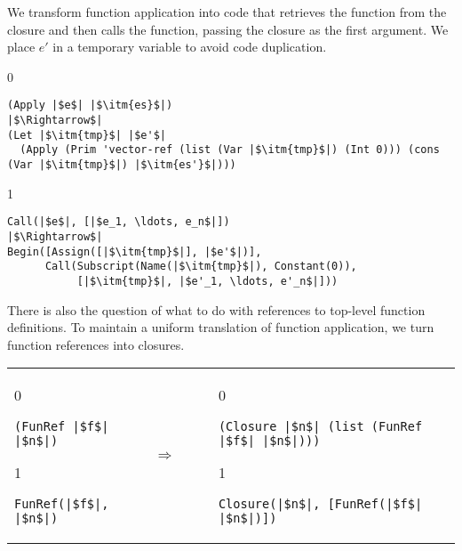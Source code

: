 \documentclass[7x10]{TimesAPriori_MIT}%
\def\racketEd{0}
\def\pythonEd{1}
\def\edition{1}
\newcommand{\pythonColor}[0]{}
\numberwithin{theorem}{chapter}
\numberwithin{definition}{chapter}
\numberwithin{equation}{chapter}
\begin{document}
We transform function application into code that retrieves the
function from the closure and then calls the function, passing the
closure as the first argument. We place $e'$ in a temporary variable
to avoid code duplication.
\begin{center}
\begin{minipage}{\textwidth}
{\if\edition\racketEd
\begin{lstlisting}
(Apply |$e$| |$\itm{es}$|)
|$\Rightarrow$|
(Let |$\itm{tmp}$| |$e'$|
  (Apply (Prim 'vector-ref (list (Var |$\itm{tmp}$|) (Int 0))) (cons (Var |$\itm{tmp}$|) |$\itm{es'}$|)))
\end{lstlisting}
\fi}
%
{\if\edition\pythonEd\pythonColor
\begin{lstlisting}
Call(|$e$|, [|$e_1, \ldots, e_n$|])
|$\Rightarrow$|
Begin([Assign([|$\itm{tmp}$|], |$e'$|)],
      Call(Subscript(Name(|$\itm{tmp}$|), Constant(0)),
           [|$\itm{tmp}$|, |$e'_1, \ldots, e'_n$|]))
\end{lstlisting}
\fi}
\end{minipage}
\end{center}

There is also the question of what to do with references to top-level
function definitions. To maintain a uniform translation of function
application, we turn function references into closures.

\begin{tabular}{lll}
\begin{minipage}{0.2\textwidth}
{\if\edition\racketEd
\begin{lstlisting}
(FunRef |$f$| |$n$|)
\end{lstlisting}
\fi}
{\if\edition\pythonEd\pythonColor
\begin{lstlisting}
FunRef(|$f$|, |$n$|)
\end{lstlisting}
\fi}
\end{minipage}
&
$\Rightarrow\qquad$
&
\begin{minipage}{0.5\textwidth}
{\if\edition\racketEd
\begin{lstlisting}
(Closure |$n$| (list (FunRef |$f$| |$n$|)))
\end{lstlisting}
\fi}
{\if\edition\pythonEd\pythonColor
\begin{lstlisting}
Closure(|$n$|, [FunRef(|$f$| |$n$|)])
\end{lstlisting}
\fi}
\end{minipage}
\end{tabular}  \\
\end{document}
